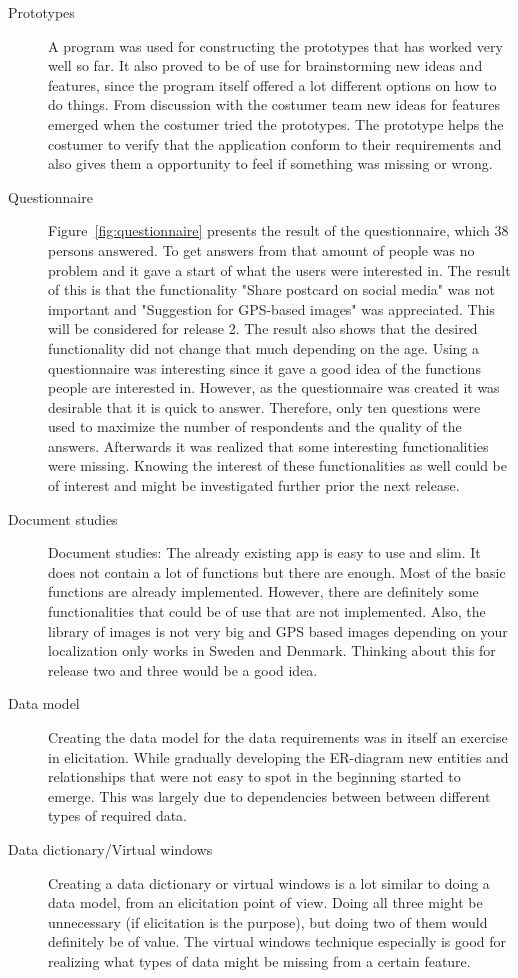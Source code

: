 \documentclass[10pt,a4paper]{article}
\begin{document}
\begin{description}
\item[Prototypes] A program was used for constructing the prototypes that has worked very well so far. It also proved to be of use for brainstorming new ideas and features, since the program itself offered a lot different options on how to do things. 
From discussion with the costumer team new ideas for features emerged when the costumer tried the prototypes. The prototype helps the costumer to verify that the application conform to their requirements and also gives them a opportunity to feel if something was missing or wrong.

\item[Questionnaire] Figure~\ref{fig:questionnaire} presents the result of the questionnaire, which 38 persons answered. To get answers from that amount of people was no problem and it gave a start of what the users were interested in. The result of this is that the functionality "Share postcard on social media" was not important and "Suggestion for GPS-based images" was appreciated. This will be considered for release 2. The result also shows that the desired functionality did not change that much depending on the age. Using a questionnaire was interesting since it gave a good idea of the functions people are interested in. However, as the questionnaire  was created it was desirable that it is quick to answer. Therefore, only ten questions were used to maximize the number of respondents and the quality of the answers. Afterwards it was realized that some interesting functionalities were missing. Knowing the interest of these functionalities as well could be of interest and might be investigated further prior the next release.

\item[Document studies] Document studies: The already existing app is easy to use and slim. It does not contain a lot of functions but there are enough. Most of the basic functions are already implemented. However, there are definitely some functionalities that could be of use that are not implemented. Also, the library of images is not very big and GPS based images depending on your localization only works in Sweden and Denmark. Thinking about this for release two and three would be a good idea.

\item[Data model] Creating the data model for the data requirements was in itself an exercise in elicitation. While gradually developing the ER-diagram new entities and relationships that were not easy to spot in the beginning started to emerge. This was largely due to dependencies between between different types of required data.

\item[Data dictionary/Virtual windows] Creating a data dictionary or virtual windows is a lot similar to doing a data model, from an elicitation point of view. Doing all three might be unnecessary (if elicitation is the purpose), but doing two of them would definitely be of value. The virtual windows technique especially is good for realizing what types of data might be missing from a certain feature.
\end{description}
\end{document}
